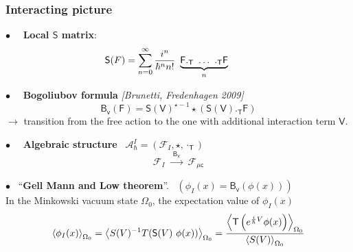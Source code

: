 \documentclass[9pt]{beamer}
\newcommand{\Tdot}{\cdot_\Tsf} %
\newcommand{\Smearip}[1]{\left\langle #1 \right\rangle} %
\newcommand{\citebeam}[1]{\textit{\textcolor{black!60!white}{[#1]}}} %
\newcommand{\Acal}{\mathcal{A}}
\newcommand{\Fcal}{\mathcal{F}}
\newcommand{\Bsf}{\mathsf{B}}
\newcommand{\Fsf}{\mathsf{F}}
\newcommand{\Ssf}{\mathsf{S}}
\newcommand{\Tsf}{\mathsf{T}}
\newcommand{\Vsf}{\mathsf{V}}
\newcommand{\csf}{\mathsf{c}}
\newcommand{\vsf}{\mathsf{v}}
\begin{document}
\begin{frame}

\frametitle{Interacting picture}

\vfill

$\bullet \quad$ \textbf{Local $\Ssf$ matrix}:
\vspace*{-17pt}
\begin{equation*}
 \hspace*{-25pt} \Ssf(F) = \sum_{n=0}^{\infty} \frac{i^n}{\hbar^n n!} \ \underbrace{\Fsf ._\Tsf \ \dots \ ._\Tsf \Fsf}_{n}
\end{equation*}

\vfill

$\bullet \quad$ \textbf{Bogoliubov formula} \citebeam{Brunetti, Fredenhagen 2009} \\[-10pt]
\begin{equation*}
 \Bsf_\vsf(\Fsf) = \Ssf(\Vsf)^{\star -1} \star \left( \Ssf(\Vsf) ._{\Tsf} \Fsf \right) 
\end{equation*}
$\to$  transition from the free action to the one with additional interaction term $\Vsf$.

\vfill

$\bullet \quad$ \textbf{Algebraic structure} \ $\Acal^I_\hbar = \left( \Fcal_{I} , \star , \Tdot \right)$
\begin{equation*}
\Fcal_{I} \ \overset{\ \ \Bsf_\vsf \ \ }{\longrightarrow} \ \Fcal_{\mu \csf}
\end{equation*}

\vfill

$\bullet$ \ ``\textbf{Gell Mann and Low theorem}''. \ $\left( \phi_I(x) = \Bsf_\vsf(\phi(x)) \right)$ \\

\hspace*{9pt} In the Minkowski vacuum state $\Omega_0$, the expectation value of $\phi_I(x)$
\vspace*{-6pt}
\begin{equation*}
\Smearip{ \phi_I(x) }_{\Omega_0} 
= 
\Smearip{ S(V)^{-1} T( \Ssf(V) \ \phi(x)) }_{\Omega_0} 
= 
\frac{%
\Smearip{ \Tsf\left(e^{\frac{i}{\hbar} V} \phi(x) \right) }_{\Omega_0}
}{%
\left\langle S(V) \right\rangle_{\Omega_0}
}
\end{equation*}

\end{frame}  

\end{document}
